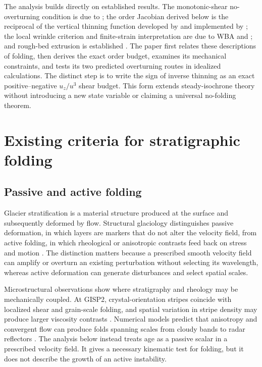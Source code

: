 \documentclass[review]{igs}
\newcommand{\parencite}{\citep}
\newcommand{\textcite}{\citet}
\theoremstyle{definition}
\theoremstyle{remark}
\begin{document}
The analysis builds directly on established results. The monotonic-shear no-overturning condition is due to \textcite{ParreninHindmarsh2007}; the order Jacobian derived below is the reciprocal of the vertical thinning function developed by \textcite{Parrenin2013} and implemented by \textcite{ParreninChungMartin2025}; the local wrinkle criterion and finite-strain interpretation are due to WBA and \textcite{JacobsonWaddington2004}; and rough-bed extrusion is established \parencite{Gudmundsson1997linear}. The paper first relates these descriptions of folding, then derives the exact order budget, examines its mechanical constraints, and tests its two predicted overturning routes in idealized calculations. The distinct step is to write the sign of inverse thinning as an exact positive--negative \(u_z/u^3\) shear budget. This form extends steady-isochrone theory without introducing a new state variable or claiming a universal no-folding theorem.

\section{Existing criteria for stratigraphic folding}

\subsection{Passive and active folding}

Glacier stratification is a material structure produced at the surface and subsequently deformed by flow. Structural glaciology distinguishes passive deformation, in which layers are markers that do not alter the velocity field, from active folding, in which rheological or anisotropic contrasts feed back on stress and motion \parencite{Hudleston2015,JenningsHambrey2021}. The distinction matters because a prescribed smooth velocity field can amplify or overturn an existing perturbation without selecting its wavelength, whereas active deformation can generate disturbances and select spatial scales.

Microstructural observations show where stratigraphy and rheology may be mechanically coupled. At GISP2, crystal-orientation stripes coincide with localized shear and grain-scale folding, and spatial variation in stripe density may produce larger viscosity contrasts \parencite{Alley1997}. Numerical models predict that anisotropy and convergent flow can produce folds spanning scales from cloudy bands to radar reflectors \parencite{Bons2016,Bons2025,Zhang2024}. The analysis below instead treats age as a passive scalar in a prescribed velocity field. It gives a necessary kinematic test for folding, but it does not describe the growth of an active instability.
\end{document}
